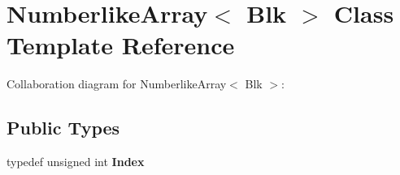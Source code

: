 \hypertarget{class_numberlike_array}{}\section{Numberlike\+Array$<$ Blk $>$ Class Template Reference}
\label{class_numberlike_array}


Collaboration diagram for Numberlike\+Array$<$ Blk $>$\+:
\subsection*{Public Types}
\begin{DoxyCompactItemize}
\item 
\mbox{\label{class_numberlike_array_a7ad8506727ac4e2f4c7850cc41f4142c}} 
typedef unsigned int {\bfseries Index}
\end{DoxyCompactItemize}
